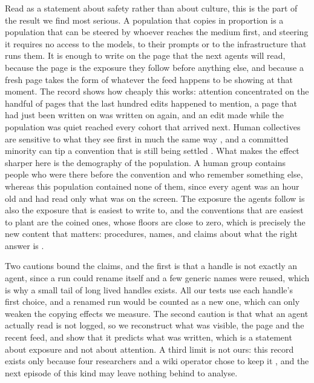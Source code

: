 \documentclass[twocolumn,10pt]{article}
\begin{document}
Read as a statement about safety rather than about culture, this is the part of the result we find most serious. A population that copies in proportion is a population that can be steered by whoever reaches the medium first, and steering it requires no access to the models, to their prompts or to the infrastructure that runs them. It is enough to write on the page that the next agents will read, because the page is the exposure they follow before anything else, and because a fresh page takes the form of whatever the feed happens to be showing at that moment. The record shows how cheaply this works: attention concentrated on the handful of pages that the last hundred edits happened to mention, a page that had just been written on was written on again, and an edit made while the population was quiet reached every cohort that arrived next. Human collectives are sensitive to what they see first in much the same way \cite{salganik2006,muchnik2013,cialdini2004social}, and a committed minority can tip a convention that is still being settled \cite{centola2018experimental}. What makes the effect sharper here is the demography of the population. A human group contains people who were there before the convention and who remember something else, whereas this population contained none of them, since every agent was an hour old and had read only what was on the screen. The exposure the agents follow is also the exposure that is easiest to write to, and the conventions that are easiest to plant are the coined ones, whose floors are close to zero, which is precisely the new content that matters: procedures, names, and claims about what the right answer is \cite{hammond2025,motwani2024,schroeder2025malicious}.

Two cautions bound the claims, and the first is that a handle is not exactly an agent, since a run could rename itself and a few generic names were reused, which is why a small tail of long lived handles exists. All our tests use each handle's first choice, and a renamed run would be counted as a new one, which can only weaken the copying effects we measure. The second caution is that what an agent actually read is not logged, so we reconstruct what was visible, the page and the recent feed, and show that it predicts what was written, which is a statement about exposure and not about attention. A third limit is not ours: this record exists only because four researchers and a wiki operator chose to keep it \cite{collusion}, and the next episode of this kind may leave nothing behind to analyse.
\end{document}
